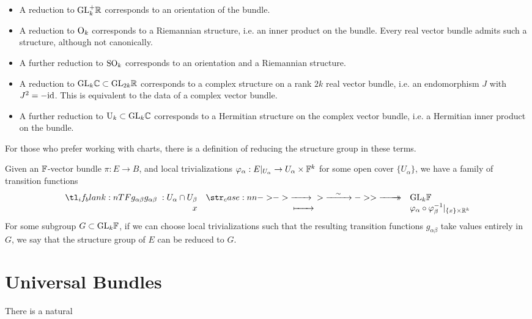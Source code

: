 \begin{itemize}
	\item A reduction to $\mathrm{GL}^+_k\mathbb{R}$ corresponds to an orientation of the bundle.
	\item A reduction to $\mathrm{O}_k$ corresponds to a Riemannian structure, i.e. an inner product on the bundle. Every real vector bundle admits such a structure, although not canonically.
	\item A further reduction to $\mathrm{SO}_k$ corresponds to an orientation and a Riemannian structure.
	\item A reduction to $\mathrm{GL}_{k}\mathbb{C}\subset \mathrm{GL}_{2k}\mathbb{R}$ corresponds to a complex structure on a rank $2k$ real vector bundle, i.e. an endomorphism $J$ with $J^2=-\mathrm{id}$. This is equivalent to the data of a complex vector bundle.
	\item A further reduction to $\mathrm{U}_k\subset \mathrm{GL}_k\mathbb{C}$ corresponds to a Hermitian structure on the complex vector bundle, i.e. a Hermitian inner product on the bundle.
\end{itemize}

\begin{remark}
	For those who prefer working with charts, there is a definition of reducing the structure group in these terms.

	Given an $\mathbb{F}$-vector bundle $\pi : E \to B$, and local trivializations $\varphi_\alpha : E|_{U_\alpha} \to U_{\alpha}\times \mathbb{F}^k$ for some open cover $\{U_\alpha\}$, we have a family of transition functions
	\[
		\lkxfunc{g_{\alpha\beta}}{U_\alpha\cap U_\beta}{\GL_k \F}{x}{\varphi_\alpha\circ \varphi_{\beta}^{-1}|_{\{x\}\times \R^k}}
	\]
	For some subgroup $G\subset \mathrm{GL}_k\mathbb{F}$, if we can choose local trivializations such that the resulting transition functions $g_{\alpha\beta}$ take values entirely in $G$, we say that the structure group of $E$ can be reduced to $G$. 
\end{remark}

\begin{remark}
\end{remark}

\section{Universal Bundles}

\begin{proposition}\label{prop:homotopy-invariance-vector-bundle}
	There is a natural
\end{proposition}

